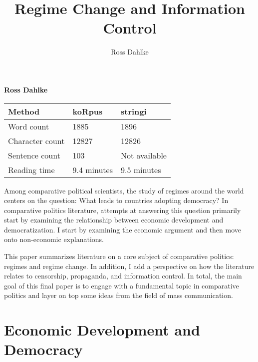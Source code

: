 \documentclass[12pt,]{article}
\title{Regime Change and Information Control  }
\author{\Large Ross Dahlke\vspace{0.05in} \newline\normalsize\emph{}  }
\date{}
\newcommand*{\authorfont}{\fontfamily{phv}\selectfont}
\begin{document}
	
%

{%
\setlength{\parindent}{0pt}
\thispagestyle{plain}
{\fontsize{18}{20}\selectfont\raggedright 
\maketitle  %

}

{
   \vskip 13.5pt\relax \normalsize\fontsize{11}{12} 
\textbf{\authorfont Ross Dahlke} \hskip 15pt \emph{\small }   

}

}






\vskip -8.5pt



\noindent \doublespacing 

\begin{longtable}[]{@{}lll@{}}
\toprule
Method & koRpus & stringi\tabularnewline
\midrule
\endhead
Word count & 1885 & 1896\tabularnewline
Character count & 12827 & 12826\tabularnewline
Sentence count & 103 & Not available\tabularnewline
Reading time & 9.4 minutes & 9.5 minutes\tabularnewline
\bottomrule
\end{longtable}

Among comparative political scientists, the study of regimes around the
world centers on the question: What leads to countries adopting
democracy? In comparative politics literature, attempts at answering
this question primarily start by examining the relationship between
economic development and democratization. I start by examining the
economic argument and then move onto non-economic explanations.

This paper summarizes literature on a core subject of comparative
politics: regimes and regime change. In addition, I add a perspective on
how the literature relates to censorship, propaganda, and information
control. In total, the main goal of this final paper is to engage with a
fundamental topic in comparative politics and layer on top some ideas
from the field of mass communication.

\hypertarget{economic-development-and-democracy}{%
\section{Economic Development and
Democracy}\label{economic-development-and-democracy}}
\end{document}
